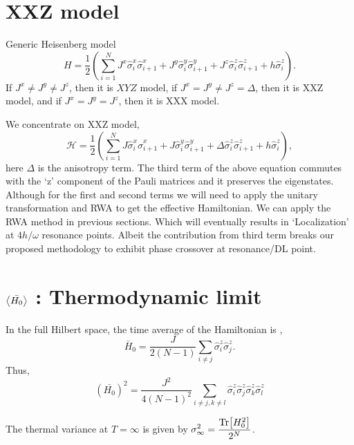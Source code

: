 \documentclass[a4paper,11pt]{article}
\begin{document}
\section{XXZ model}
Generic Heisenberg model
\begin{equation*}
H = \frac12 \left( \sum_{i=1}^N J^x \hat{\sigma}^x_i \hat{\sigma}^x_{i+1} +J^y  \hat{\sigma}^y_i \hat{\sigma}^y_{i+1} + J^z  \hat{\sigma}^z_i \hat{\sigma}^z_{i+1} + h  \hat{\sigma}^z_i\right).
\end{equation*}
If $J^x\neq J^y \neq J^z$, then it is $XYZ$ model, if $J^x= J^y \neq J^z=\Delta$, then it is XXZ model, and if $J^x= J^y=J^z$, then it is XXX model.

We concentrate on XXZ model,
\begin{equation}
	\mathcal{H} = \frac12 \left( \sum_{i=1}^N J \hat{\sigma}^x_i \hat{\sigma}^x_{i+1} +J  \hat{\sigma}^y_i \hat{\sigma}^y_{i+1} + \Delta \hat{\sigma}^z_i \hat{\sigma}^z_{i+1} + h  \hat{\sigma}^z_i\right),
\end{equation}
here $\Delta$ is the anisotropy term. The third term of the above equation commutes with the `z' component of the Pauli matrices and it preserves the eigenstates. 
Although for the first and second terms we will need to apply the unitary transformation and RWA to get the effective Hamiltonian. We can apply the RWA method in previous sections. Which will eventually results in `Localization' at $4h/\omega$ resonance points. Albeit the contribution from third term breaks our proposed methodology to exhibit phase crossover at resonance/DL point.

\section{$\expval{\bar{H_0}}$ : Thermodynamic limit}
In the full Hilbert space, the time average of the Hamiltonian is ,
\begin{equation*}
\bar{H}_0 = \frac{J}{2(N-1)}\sum_{i\neq j}\hat{\sigma}^z_i \hat{\sigma}^z_j.
\end{equation*}
Thus,
\begin{equation}
	\left(\bar{H_0}\right)^2 = \frac{J^2}{4(N-1)^2}\sum_{i\neq j, k \neq l} \hat{\sigma}^z_i \hat{\sigma}^z_j \hat{\sigma}^z_k \hat{\sigma}^z_l
\end{equation}

The thermal variance at $T= \infty$ is given by $\displaystyle \sigma^2_{\infty} = \frac{\Tr[H^2_0]}{2^N}$. 
\end{document}
